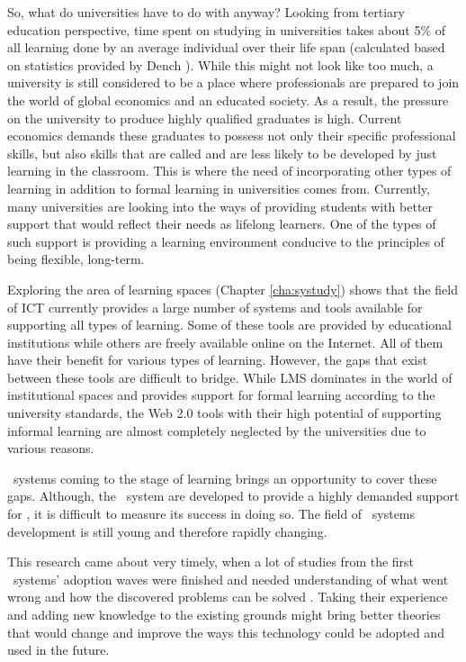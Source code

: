 So, what do universities have to do with \LLLs anyway? Looking from tertiary
education perspective, time spent on studying in universities takes about 5\% of
all learning done by an average individual over their life span (calculated
based on statistics provided by Dench \citeyearpar[28-37]{Dench2010}). While
this might not look like too much, a university is still considered to be a
place where professionals are prepared to join the world of global economics
and an educated society. As a result, the pressure on the university to produce
highly qualified graduates is high. Current economics demands these graduates to
possess not only their specific professional skills, but also skills that are
called \LLLs and are less likely to be developed by just learning in the
classroom. This is where the need of incorporating other types of learning in
addition to formal learning in universities comes from. Currently, many
universities are looking into the ways of providing students with better support
that would reflect their needs as lifelong learners. One of the types of such
support is providing a learning environment conducive to the principles of
being flexible, long-term.


Exploring the area of learning spaces (Chapter \ref{cha:systudy}) shows that
the field of ICT currently provides a large number of systems and tools
available for supporting all types of learning. Some of these tools are provided
by educational institutions while others are freely available online on the
Internet. All of them have their benefit for various types of learning. However,
the gaps that exist between these tools are difficult to bridge. While LMS
dominates in the world of institutional spaces and provides support for formal
learning according to the university standards, the Web 2.0 tools with their
high potential of supporting informal learning are almost completely neglected
by the universities due to various reasons.

\ep~systems coming to the stage of learning brings an opportunity to cover these
gaps. Although, the \ep~system are developed to provide a highly demanded
support for \LLLsn, it is difficult to measure its success in doing so. The
field of \ep~systems development is still young and therefore rapidly changing.

This research came about very timely, when a lot of studies from the first
\ep~systems' adoption waves were finished and needed understanding of what went
wrong and how the discovered problems can be solved \citep{Batson2010}. Taking
their experience and adding new knowledge to the existing grounds might bring
better theories that would change and improve the ways this technology could be
adopted and used in the future.

